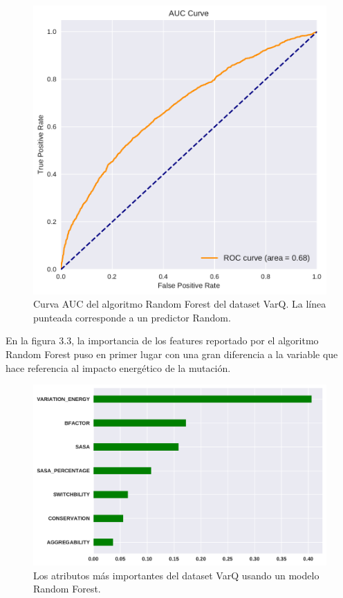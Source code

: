 \begin{figure}[h]
    \centering
    \includegraphics[scale=0.55]{documents/latex/figures/3/auc_varq.pdf}
    \caption{Curva AUC del algoritmo Random Forest del dataset VarQ. La línea punteada corresponde a un predictor Random. }
    \label{fig:auc_varq}
\end{figure}

En la figura 3.3, la importancia de los features reportado por el algoritmo Random Forest puso en primer lugar con una gran diferencia a la variable que hace referencia al impacto energético de la mutación.  


\begin{figure}[H]
    \centering
    \includegraphics[scale=0.55]{documents/latex/figures/3/importances_varq.pdf}
    \caption{Los atributos más importantes del dataset VarQ usando un modelo Random Forest. }
    \label{fig:importance_varq}
\end{figure}


